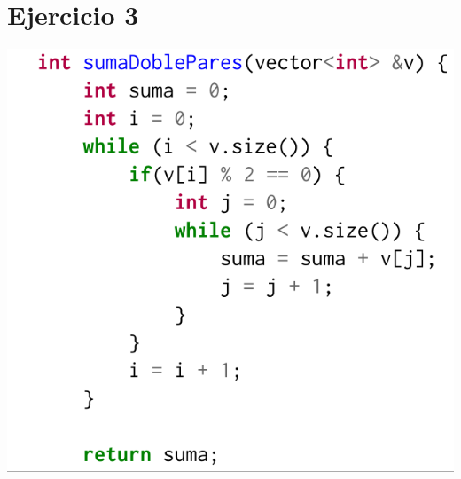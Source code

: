 \documentclass[12 pt]{article}
\begin{document}
\section*{Ejercicio 3}
    \begin{center}
        \includegraphics[width=0.7 \linewidth]{img/ej3.png}
    \end{center}
\end{document}
